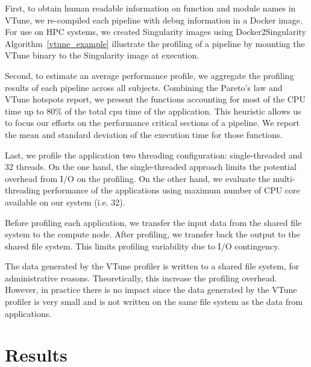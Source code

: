 \documentclass[conference]{IEEEtran}
\renewcommand{\lstlistingname}{Algorithm}
\begin{document}
First, to obtain human readable information on function and module names in VTune, we re-compiled each pipeline with debug information in a Docker image. For use on HPC systems, we created Singularity images using Docker2Singularity \lstlistingname~\ref{vtune_example} illustrate the profiling of a pipeline by mounting the VTune binary to the Singularity image at execution.


Second, to estimate an average performance profile, we aggregate the profiling results of each pipeline across all subjects. Combining the Pareto's law and VTune hotspots report, we present the functions accounting for most of the CPU time up to 80\% of the total cpu time of the application. This heuristic allows us to focus our efforts on the performance critical sections of a pipeline. We report the mean and standard deviation of the execution time for those functions.

Last, we profile the application two threading configuration: single-threaded and 32 threads. On the one hand, the single-threaded approach limits the potential overhead from I/O on the profiling. On the other hand, we evaluate the multi-threading performance of the applications using maximum number of CPU core available on our system (i.e. 32).

Before profiling each application, we transfer the input data from the shared file system to the compute node. After profiling, we transfer back the output to the shared file system. This limits profiling variability due to I/O contingency.

The data generated by the VTune profiler is written to a shared file system, for administrative reasons. Theoretically, this increase the profiling overhead. However, in practice there is no impact since the data generated by the VTune profiler is very small and is not written on the same file system as the data from applications.

\section{Results}
\end{document}
